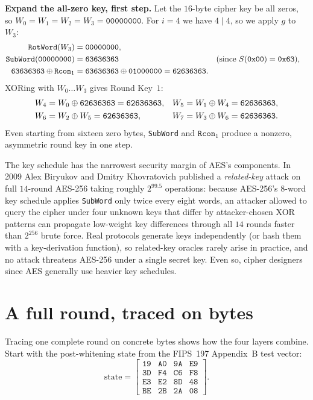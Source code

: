\begin{walkbox}
\textbf{Expand the all-zero key, first step.} Let the $16$-byte cipher key be all
zeros, so $W_0 = W_1 = W_2 = W_3 = \mathtt{00000000}$. For $i = 4$ we have
$4 \mid 4$, so we apply $g$ to $W_3$:
\begin{align*}
\texttt{RotWord}(W_3) &= \mathtt{00000000}, \\
\texttt{SubWord}(\mathtt{00000000}) &= \mathtt{63636363} && \text{(since $S(\mathtt{0x00}) = \mathtt{0x63}$),} \\
\mathtt{63636363} \oplus \texttt{Rcon}_1 &= \mathtt{63636363} \oplus \mathtt{01000000} = \mathtt{62636363}.
\end{align*}
XORing with $W_0\dots W_3$ gives Round Key~$1$:
\begin{align*}
W_4 &= W_0 \oplus \mathtt{62636363} = \mathtt{62636363}, &
W_5 &= W_1 \oplus W_4 = \mathtt{62636363}, \\
W_6 &= W_2 \oplus W_5 = \mathtt{62636363}, &
W_7 &= W_3 \oplus W_6 = \mathtt{62636363}.
\end{align*}
Even starting from sixteen zero bytes, \texttt{SubWord} and $\texttt{Rcon}_1$
produce a nonzero, asymmetric round key in one step.
\end{walkbox}

\begin{trapbox}
The key schedule has the narrowest security margin of AES's components. In 2009
Alex Biryukov and Dmitry Khovratovich published a \emph{related-key} attack on
full $14$-round AES-256 taking roughly $2^{99.5}$ operations: because AES-256's
$8$-word key schedule applies \texttt{SubWord} only twice every eight words, an
attacker allowed to query the cipher under four unknown keys that differ by
attacker-chosen XOR patterns can propagate low-weight key differences through all
$14$ rounds faster than $2^{256}$ brute force. Real protocols generate keys
independently (or hash them with a key-derivation function), so related-key
oracles rarely arise in practice, and no attack threatens AES-256 under a single
secret key. Even so, cipher designers since AES generally use heavier key schedules.
\end{trapbox}

\section{A full round, traced on bytes}
\label{ch12:trace}

Tracing one complete round on concrete bytes shows how the four layers combine.
Start with the post-whitening state from the FIPS~197 Appendix~B test vector:
\[
\text{state} =
\begin{bmatrix}
\mathtt{19} & \mathtt{A0} & \mathtt{9A} & \mathtt{E9}\\
\mathtt{3D} & \mathtt{F4} & \mathtt{C6} & \mathtt{F8}\\
\mathtt{E3} & \mathtt{E2} & \mathtt{8D} & \mathtt{48}\\
\mathtt{BE} & \mathtt{2B} & \mathtt{2A} & \mathtt{08}
\end{bmatrix}.
\]

